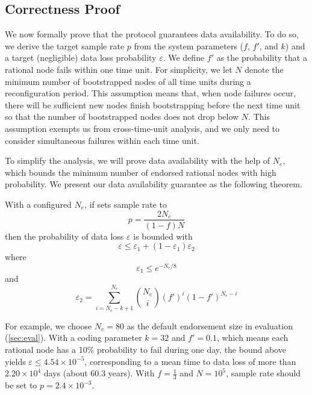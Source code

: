 \subsection{Correctness Proof}
\label{sec:design:proof}
We now formally prove that the \sys protocol guarantees data availability.
To do so, we derive the target sample rate $p$ from the system parameters ($f$, $f'$, and $k$) and a target (negligible) data loss probability $\varepsilon$.
We define $f'$ as the probability that a rational node fails within one time unit.
For simplicity, we let $N$ denote the minimum number of bootstrapped nodes of all time units during a reconfiguration period.
This assumption means that, when node failures occur, there will be sufficient new nodes finish bootstrapping before the next time unit so that the number of bootstrapped nodes does not drop below $N$.
This assumption exempts us from cross-time-unit analysis, and we only need to consider simultaneous failures within each time unit.

To simplify the analysis, we will prove data availability with the help of $N_e$, which bounds the minimum number of endorsed rational nodes with high probability.
We present our data availability guarantee as the following theorem.
\begin{theorem}\label{thm:main}
With a configured $N_e$, if \sys sets sample rate to
$$p=\frac{2N_e}{(1-f)N}$$
then the probability of data loss $\varepsilon$ is bounded with
$$\varepsilon\leq \varepsilon_1+(1-\varepsilon_1)\varepsilon_2$$
where
$$\varepsilon_1\le e^{-N_e/8}$$
and
$$
\varepsilon_2=
\sum_{i=N_e-k+1}^{N_e}
\binom{N_e}{i}(f')^i(1-f')^{N_e-i}
$$
\end{theorem}
For example, we choose $N_e=80$ as the default endorsement size in evaluation (\cref{sec:eval}).
With a coding parameter $k=32$ and $f'=0.1$, which means each rational node has a 10\% probability to fail during one day,
the bound above yields $\varepsilon\le 4.54\times 10^{-5}$, corresponding to a mean time to data loss of more than $2.20\times 10^{4}$ days (about 60.3 years).
With $f=\frac{1}{3}$ and $N=10^5$, sample rate should be set to $p=2.4\times10^{-3}$.

